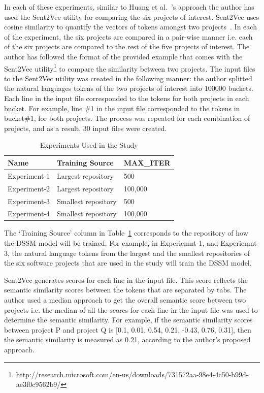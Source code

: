 \documentclass[conference]{IEEEtran}
\begin{document}
In each of these experiments, similar to Huang et al.~\cite{Huang:CIKM}'s approach the author has used the Sent2Vec utility for comparing the six projects of interest. Sent2Vec uses cosine similarity to quantify the vectors of tokens amongst two projects~\cite{Huang:CIKM}. In each of the experiment, the six projects are compared in a pair-wise manner i.e. each of the six projects are compared to the rest of the five projects of interest. The author has followed the format of the provided example that comes with the Sent2Vec utility\footnote{http://research.microsoft.com/en-us/downloads/731572aa-98e4-4c50-b99d-ae3f0c9562b9/} to compare the similarity between two projects. The input files to the Sent2Vec utility was created in the following manner: the author splitted the natural languages tokens of the two projects of interest into 100000 buckets. Each line in the input file
corresponded to the tokens for both projects in each bucket. For example, line \#1 in the input file corresponded to the tokens in bucket\#1, for both projects. The process was repeated for each combination of projects, and as a result, 30 input files were created.
\begin{table}[]
\centering
\caption{Experiments Used in the Study}
\label{table-experiments}
\begin{tabular}{lll}
\hline
Name & Training Source & MAX\_ITER   \\
\hline 
Experiment-1 & Largest  repository &  500  \\
Experiment-2 & Largest  repository &  100,000  \\
Experiment-3 & Smallest repository &  500  \\
Experiment-4 & Smallest repository &  100,000  \\
\hline 
\end{tabular}
\end{table} 
The `Training Source' column in Table~\ref{table-experiments} corresponds to the repository of how the DSSM model will be trained. For example, in Experiemnt-1, and Experiemnt-3, the natural language tokens from the largest and the smallest repositories of the six software projects that are used in the study will train the DSSM model.    

Sent2Vec generates scores for each line in the input file. This score reflects the semantic similarity scores between the tokens that are separated by tabs. The author used a median approach to get the overall semantic score between two projects i.e. the median of all the scores for each line in the input file was used to determine the semantic similarity. For example, if the semantic similarity scores between project P and project Q is [0.1, 0.01, 0.54, 0.21, -0.43, 0.76, 0.31], then the semantic similarity is measured as 0.21, according to the author's proposed approach.  
      
\end{document}
